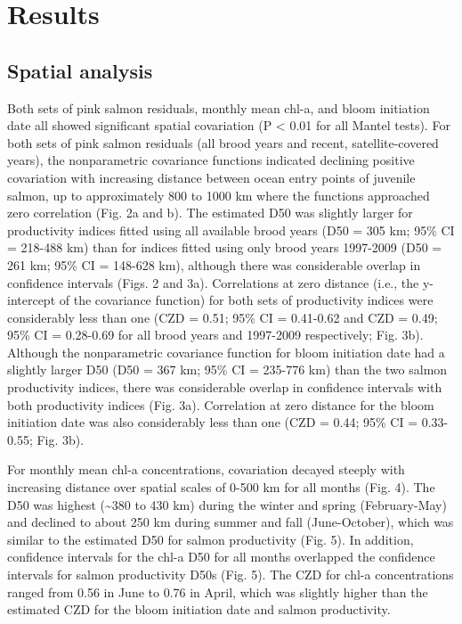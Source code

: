 \section{Results}

\subsection{Spatial analysis}

Both sets of pink salmon residuals, monthly mean chl-a, and bloom initiation
date all showed significant spatial covariation (P \textless{} 0.01 for all
Mantel tests). For both sets of pink salmon residuals (all brood years and
recent, satellite-covered years), the nonparametric covariance functions
indicated declining positive covariation with increasing distance between ocean
entry points of juvenile salmon, up to approximately 800 to 1000 km where the
functions approached zero correlation (Fig. 2a and b). The estimated D50 was
slightly larger for productivity indices fitted using all available brood years
(D50 = 305 km; 95\% CI = 218-488 km) than for indices fitted using only brood
years 1997-2009 (D50 = 261 km; 95\% CI = 148-628 km), although there was
considerable overlap in confidence intervals (Figs. 2 and 3a). Correlations at
zero distance (i.e., the y-intercept of the covariance function) for both sets
of productivity indices were considerably less than one (CZD = 0.51; 95\% CI =
0.41-0.62 and CZD = 0.49; 95\% CI = 0.28-0.69 for all brood years and 1997-2009
respectively; Fig. 3b). Although the nonparametric covariance function for bloom
initiation date had a slightly larger D50 (D50 = 367 km; 95\% CI = 235-776 km)
than the two salmon productivity indices, there was considerable overlap in
confidence intervals with both productivity indices (Fig. 3a). Correlation at
zero distance for the bloom initiation date was also considerably less than one
(CZD = 0.44; 95\% CI = 0.33-0.55; Fig. 3b).

For monthly mean chl-a concentrations, covariation decayed steeply with
increasing distance over spatial scales of 0-500 km for all months (Fig.  4).
The D50 was highest (\textasciitilde{}380 to 430 km) during the winter and
spring (February-May) and declined to about 250 km during summer and fall
(June-October), which was similar to the estimated D50 for salmon productivity
(Fig. 5). In addition, confidence intervals for the chl-a D50 for all months
overlapped the confidence intervals for salmon productivity D50s (Fig. 5). The
CZD for chl-a concentrations ranged from 0.56 in June to 0.76 in April, which
was slightly higher than the estimated CZD for the bloom initiation date and
salmon productivity.



